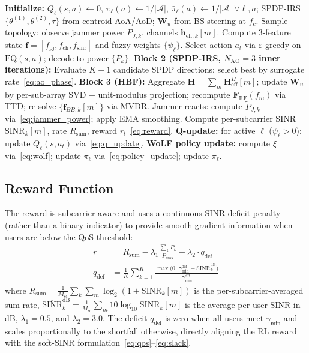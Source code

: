 \documentclass[journal,twocolumn]{IEEEtran}
\newcommand{\vect}[1]{\mathbf{#1}}
\newcommand{\mat}[1]{\mathbf{#1}}
\begin{document}
\begin{algorithm}[t]
\caption{Proposed Fuzzy WoLF-PHC RL-AO Anti-Jamming Framework}
\label{alg:framework}
\begin{algorithmic}[1]
\STATE \textbf{Initialize:} $Q_\ell(s,a) \leftarrow 0$, $\pi_\ell(a) \leftarrow 1/|\mathcal{A}|$, $\bar{\pi}_\ell(a) \leftarrow 1/|\mathcal{A}|$ $\forall \ell, a$; SPDP-IRS $\{\theta^{(1)},\theta^{(2)},\tau\}$ from centroid AoA/AoD; $\mat{W}_u$ from BS steering at $f_c$.
  \STATE Sample topology; observe jammer power $P_{J,k}$, channels $\vect{h}_{\text{eff},k}[m]$.
    \STATE Compute 3-feature state $\vect{f} = [f_{\text{pj}}, f_{\text{ch}}, f_{\text{sinr}}]$ and fuzzy weights $\{\psi_\ell\}$.
    \STATE Select action $a_t$ via $\varepsilon$-greedy on $\text{FQ}(s,a)$; decode to power $\{P_k\}$.
    \STATE \textbf{Block 2 (SPDP-IRS, $N_{\text{AO}}=3$ inner iterations):} Evaluate $K+1$ candidate SPDP directions; select best by surrogate rate~\eqref{eq:ao_phase}.
    \STATE \textbf{Block 3 (HBF):} Aggregate $\overline{\mat{H}} = \sum_{m} \mat{H}_{\text{eff}}^H[m]$; update $\mat{W}_u$ by per-sub-array SVD + unit-modulus projection; recompute $\mat{F}_{\text{RF}}(f_m)$ via TTD; re-solve $\{\vect{f}_{BB,k}[m]\}$ via MVDR.
    \STATE Jammer reacts: compute $\tilde{P}_{J,k}$ via~\eqref{eq:jammer_power}; apply EMA smoothing.
    \STATE Compute per-subcarrier SINR $\text{SINR}_k[m]$, rate $R_{\text{sum}}$, reward $r_t$~\eqref{eq:reward}.
    \STATE \textbf{Q-update:} for active $\ell$ ($\psi_\ell > 0$): update $Q_\ell(s,a_t)$ via~\eqref{eq:q_update}.
    \STATE \textbf{WoLF policy update:} compute $\xi$ via~\eqref{eq:wolf}; update $\pi_\ell$ via~\eqref{eq:policy_update}; update $\bar{\pi}_\ell$.
  \ENDFOR
\ENDFOR
\end{algorithmic}
\end{algorithm}

\subsection{Reward Function}

The reward is subcarrier-aware and uses a continuous SINR-deficit penalty (rather than a binary indicator) to provide smooth gradient information when users are below the QoS threshold:
\begin{align}
r &= R_{\text{sum}} - \lambda_1\frac{\sum_k P_k}{P_{\max}} - \lambda_2 \cdot q_{\text{def}} \label{eq:reward}\\
q_{\text{def}} &= \frac{1}{K}\sum_{k=1}^{K} \frac{\max\!\bigl(0,\, \gamma_{\min}^{\text{dB}} - \overline{\text{SINR}}_k^{\text{dB}}\bigr)}{|\gamma_{\min}^{\text{dB}}|} \label{eq:qdef}
\end{align}
where $R_{\text{sum}} = \frac{1}{M_{\text{sc}}}\sum_k\sum_m \log_2(1 + \text{SINR}_k[m])$ is the per-subcarrier-averaged sum rate, $\overline{\text{SINR}}_k^{\text{dB}} = \frac{1}{M_{\text{sc}}}\sum_m 10\log_{10}\text{SINR}_k[m]$ is the average per-user SINR in dB, $\lambda_1=0.5$, and $\lambda_2=3.0$. The deficit $q_{\text{def}}$ is zero when all users meet $\gamma_{\min}$ and scales proportionally to the shortfall otherwise, directly aligning the RL reward with the soft-SINR formulation~\eqref{eq:qos}--\eqref{eq:slack}.
\end{document}
